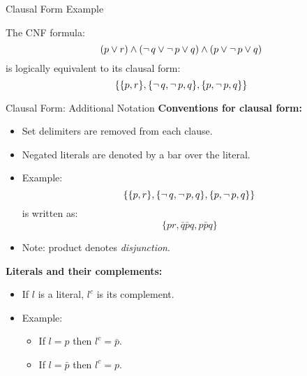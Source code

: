 \begin{wideslide}[bm=,toc=]{Clausal Form Example}
\begin{ex}{4.7}
The CNF formula:
\[ (p \lor r)\land (\mathop{\neg} q \lor \mathop{\neg} p \lor q) \land (p \lor \mathop{\neg} p \lor q) \] is
logically equivalent to its clausal form:
\[ \{\{p,r\},\{\mathop{\neg} q, \mathop{\neg} p, q\},\{p, \mathop{\neg} p, q\} \} \]
\end{ex}
\end{wideslide}

\begin{wideslide}[bm=,toc=]{Clausal Form: Additional Notation}
\textbf{Conventions for clausal form:}
\begin{itemize}
\item Set delimiters are removed from each clause.
\item Negated literals are denoted by a bar over the literal.
\item Example: \[ \{\{p,r\},\{\mathop{\neg} q, \mathop{\neg} p, q\},\{p, \mathop{\neg} p, q\} \} \] is
written as:
\[\{pr, \bar{q}\bar{p}q, p\bar{p}q \}  \]
\vspace{-5mm}
\item Note: product denotes \emph{disjunction}.
\end{itemize}
\vspace{3mm}
\textbf{Literals and their complements:}
\begin{itemize}
\item If $l$ is a literal, $l^c$ is its complement.
\item Example: 
\begin{itemize}
\item If $l = p$ then $l^c = \bar{p}$. 
\item If $l = \bar{p}$ then $l^c = p$.
\end{itemize}
\end{itemize}
\end{wideslide}


